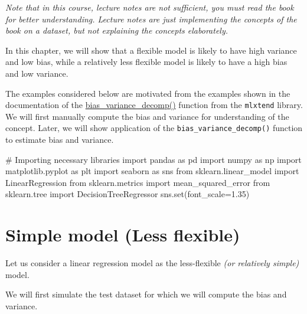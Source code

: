 \documentclass[
  letterpaper,
  DIV=11,
  numbers=noendperiod]{scrreprt}
\newenvironment{Shaded}{\begin{snugshade}}{\end{snugshade}}
\newcommand{\BuiltInTok}[1]{\textcolor[rgb]{0.00,0.23,0.31}{#1}}
\newcommand{\CommentTok}[1]{\textcolor[rgb]{0.37,0.37,0.37}{#1}}
\newcommand{\FloatTok}[1]{\textcolor[rgb]{0.68,0.00,0.00}{#1}}
\newcommand{\ImportTok}[1]{\textcolor[rgb]{0.00,0.46,0.62}{#1}}
\newcommand{\NormalTok}[1]{\textcolor[rgb]{0.00,0.23,0.31}{#1}}
\newcommand{\OperatorTok}[1]{\textcolor[rgb]{0.37,0.37,0.37}{#1}}
\begin{document}
\emph{Note that in this course, lecture notes are not sufficient, you
must read the book for better understanding. Lecture notes are just
implementing the concepts of the book on a dataset, but not explaining
the concepts elaborately.}

In this chapter, we will show that a flexible model is likely to have
high variance and low bias, while a relatively less flexible model is
likely to have a high bias and low variance.

The examples considered below are motivated from the examples shown in
the documentation of the
\href{https://rasbt.github.io/mlxtend/user_guide/evaluate/bias_variance_decomp/}{bias\_variance\_decomp()}
function from the \texttt{mlxtend} library. We will first manually
compute the bias and variance for understanding of the concept. Later,
we will show application of the \texttt{bias\_variance\_decomp()}
function to estimate bias and variance.

\begin{Shaded}
\begin{Highlighting}[]
\CommentTok{\# Importing necessary libraries}
\ImportTok{import}\NormalTok{ pandas }\ImportTok{as}\NormalTok{ pd}
\ImportTok{import}\NormalTok{ numpy }\ImportTok{as}\NormalTok{ np}
\ImportTok{import}\NormalTok{ matplotlib.pyplot }\ImportTok{as}\NormalTok{ plt}
\ImportTok{import}\NormalTok{ seaborn }\ImportTok{as}\NormalTok{ sns}
\ImportTok{from}\NormalTok{ sklearn.linear\_model }\ImportTok{import}\NormalTok{ LinearRegression}
\ImportTok{from}\NormalTok{ sklearn.metrics }\ImportTok{import}\NormalTok{ mean\_squared\_error}
\ImportTok{from}\NormalTok{ sklearn.tree }\ImportTok{import}\NormalTok{ DecisionTreeRegressor}
\NormalTok{sns.}\BuiltInTok{set}\NormalTok{(font\_scale}\OperatorTok{=}\FloatTok{1.35}\NormalTok{)}
\end{Highlighting}
\end{Shaded}

\section{Simple model (Less flexible)}\label{simple-model-less-flexible}

Let us consider a linear regression model as the less-flexible \emph{(or
relatively simple)} model.

We will first simulate the test dataset for which we will compute the
bias and variance.
\end{document}
